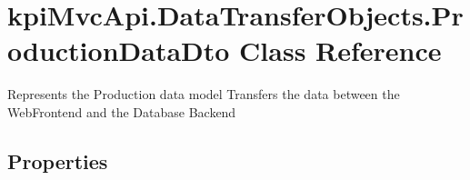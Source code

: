 \hypertarget{classkpi_mvc_api_1_1_data_transfer_objects_1_1_production_data_dto}{}\section{kpi\+Mvc\+Api.\+Data\+Transfer\+Objects.\+Production\+Data\+Dto Class Reference}
\label{classkpi_mvc_api_1_1_data_transfer_objects_1_1_production_data_dto}


Represents the Production data model Transfers the data between the Web\+Frontend and the Database Backend  


\subsection*{Properties}

